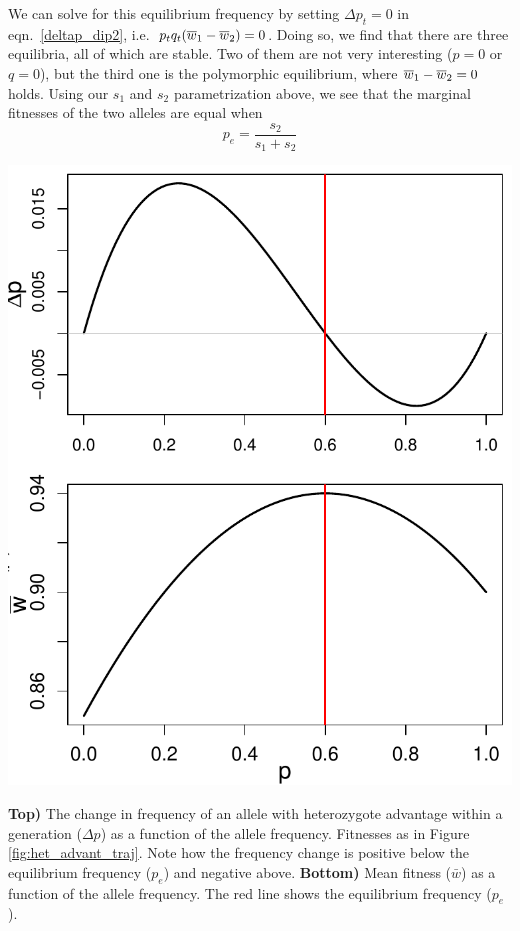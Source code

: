 We can solve for this equilibrium frequency by setting $\Delta p_t = 0$ in  eqn.\ \eqref{deltap_dip2}, 
i.e.\ $p_tq_t (\overline{w}_1-\overline{w}_2)=0$. Doing so, we find that there are three equilibria, all of which are stable. Two of them are not very interesting ($p=0$ or $q=0$), but the third one is the polymorphic equilibrium,  where
$\overline{w}_1-\overline{w}_2=0$ holds.
Using our $s_1$ and $s_2$ parametrization above, we see that the marginal fitnesses of
the two alleles are equal when
\begin{equation}
	p_e = \frac{s_2}{s_1+s_2}
  \end{equation}
      \begin{marginfigure}
\begin{center}
  \includegraphics[width = \textwidth]{figures/het_advant_dp_wbar.pdf}
\end{center}
\caption{{\bf Top)} The change in frequency of an allele with heterozygote
  advantage within a generation ($\Delta p$) as a function of the allele
frequency. Fitnesses as in Figure \ref{fig:het_advant_traj}. Note how the frequency change is positive below the
equilibrium frequency ($p_e$) and negative above. {\bf Bottom)} Mean
fitness ($\bar{w}$) as a function of the allele frequency. The red line shows
the equilibrium frequency ($p_e$). } \label{fig:het_advant_dp_wbar}
\end{marginfigure}
